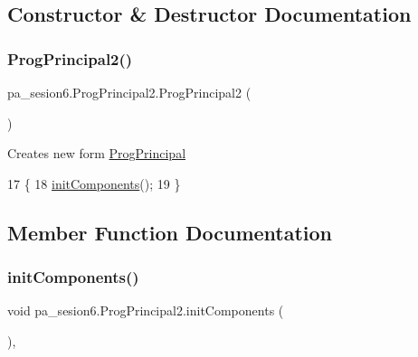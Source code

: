 \subsection{Constructor \& Destructor Documentation}
\mbox{\label{classpa__sesion6_1_1_prog_principal2_a1aed9d29f7195e51e8a0ab08f0165981}} 
\subsubsection{\texorpdfstring{Prog\+Principal2()}{ProgPrincipal2()}}
{\footnotesize\ttfamily pa\+\_\+sesion6.\+Prog\+Principal2.\+Prog\+Principal2 (\begin{DoxyParamCaption}{ }\end{DoxyParamCaption})\hspace{0.3cm}{\ttfamily [inline]}}

Creates new form \mbox{\hyperlink{classpa__sesion6_1_1_prog_principal}{Prog\+Principal}} 
\begin{DoxyCode}
17                             \{
18         \mbox{\hyperlink{classpa__sesion6_1_1_prog_principal2_aad9c52c49c917b5381a0fbd3bd0fc391}{initComponents}}();
19     \}
\end{DoxyCode}


\subsection{Member Function Documentation}
\mbox{\label{classpa__sesion6_1_1_prog_principal2_aad9c52c49c917b5381a0fbd3bd0fc391}} 
\subsubsection{\texorpdfstring{init\+Components()}{initComponents()}}
{\footnotesize\ttfamily void pa\+\_\+sesion6.\+Prog\+Principal2.\+init\+Components (\begin{DoxyParamCaption}{ }\end{DoxyParamCaption})\hspace{0.3cm}{\ttfamily [inline]}, {\ttfamily [private]}}

